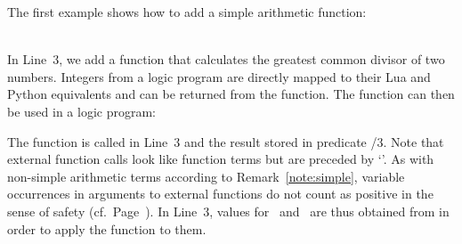 \begin{example}\label{ex:gcd}
The first example shows how to add a simple arithmetic function:
\\[-8pt] %
\begin{minipage}[t]{0.51\textwidth}

\end{minipage}
\begin{minipage}[t]{0.51\textwidth}

\end{minipage}\\
In Line~3, we add a function that calculates the greatest common divisor of two numbers.
Integers from a logic program are directly mapped to their Lua and Python equivalents
and can be returned from the function.
The  function can then be used in a logic program:%
%

%
The function is called in Line~3 and the result stored in predicate /$3$.
Note that external function calls look like function terms but are preceded by `'.
%
As with non-simple arithmetic terms
according to Remark~\ref{note:simple},
variable occurrences in arguments to external functions
do not count as positive in the sense of safety (cf.\ Page~\pageref{pg:safe}).
In Line~3, values for~ and~
are thus obtained from 
in order to apply the  function to them.
\end{example}

